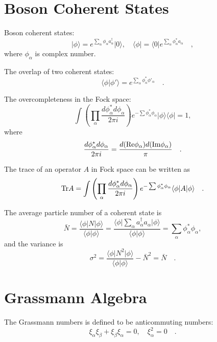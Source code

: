 \documentclass{book}
\newcommand{\bra}[1]{{\langle#1|}}
\newcommand{\ket}[1]{{|#1\rangle}}
\newcommand{\inprod}[2]{\langle#1|#2\rangle}
\numberwithin{equation}{section}
\begin{document}
\section{Boson Coherent States}
Boson coherent states:
\begin{equation}
  \ket{\phi}=e^{\sum_\alpha\phi_\alpha a_\alpha^\dag}\ket{0},\quad
  \bra{\phi}=\bra{0}e^{\sum_\alpha\phi_\alpha^* a_\alpha}\quad,
\end{equation}
where $\phi_\alpha$ is complex number.

The overlap of two coherent states:
\begin{equation}
  \inprod{\phi}{\phi'}=e^{\sum_\alpha\phi_\alpha^*\phi'_\alpha}\quad.
\end{equation}

The overcompleteness in the Fock space:
\begin{equation}
  \int\left(\prod_\alpha\frac{d\phi_\alpha^*d\phi_\alpha}{2\pi i}\right)
  e^{-\sum\phi_\alpha^*\phi_\alpha}\ket{\phi}\bra{\phi}=1,
\end{equation}
where
\begin{equation}
  \frac{d\phi_\alpha^*d\phi_\alpha}{2\pi i}=
  \frac{d({\rm Re}\phi_\alpha)d({\rm Im}\phi_\alpha)}{\pi}\quad.
\end{equation}

The trace of an operator $A$ in Fock space can be written as
\begin{equation}
  {\rm Tr}A=
  \int\left(\prod_\alpha\frac{d\phi_\alpha^*d\phi_\alpha}{2\pi i}\right)
  e^{-\sum\phi_\alpha^*\phi_\alpha}\bra{\phi}A\ket{\phi}\quad.
\end{equation}

The average particle number of a coherent state is
\begin{equation}
  \bar{N}=\frac{\bra{\phi}N\ket{\phi}}{\inprod{\phi}{\phi}}
  =\frac{\bra{\phi}\sum_\alpha a_\alpha^\dag a_\alpha\ket{\phi}}{\inprod{\phi}{\phi}}
  =\sum_\alpha\phi_\alpha^*\phi_\alpha,
\end{equation}
and the variance is
\begin{equation}
  \sigma^2=\frac{\bra{\phi}N^2\ket{\phi}}{\inprod{\phi}{\phi}}-\bar{N}^2
  =\bar{N}\quad.
\end{equation}

\section{Grassmann Algebra}
The Grassmann numbers is defined to be anticommuting numbers:
\begin{equation}
  \xi_\alpha\xi_\beta+\xi_\beta\xi_\alpha=0,\quad \xi_\alpha^2=0\quad.
\end{equation}
\end{document}

